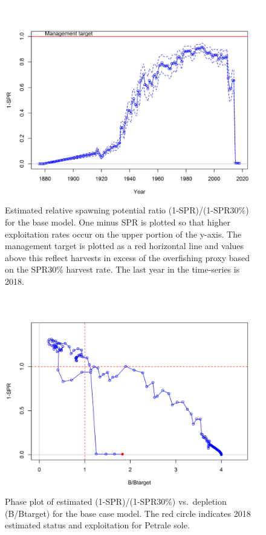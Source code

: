 \documentclass[12pt,]{article}
\begin{document}
\begin{figure}[htbp]
\centering
\includegraphics{r4ss/plots_mod1/SPR3_ratiointerval.png}
\caption{Estimated relative spawning potential ratio (1-SPR)/(1-SPR30\%)
for the base model. One minus SPR is plotted so that higher exploitation
rates occur on the upper portion of the y-axis. The management target is
plotted as a red horizontal line and values above this reflect harvests
in excess of the overfishing proxy based on the SPR30\% harvest rate.
The last year in the time-series is 2018. \label{fig:SPR_all}}
\end{figure}

\begin{figure}[htbp]
\centering
\includegraphics{r4ss/plots_mod1/SPR4_phase.png}
\caption{Phase plot of estimated (1-SPR)/(1-SPR30\%) vs.~depletion
(B/Btarget) for the base case model. The red circle indicates 2018
estimated status and exploitation for Petrale sole.
\label{fig:Phase_all}}
\end{figure}
\end{document}
